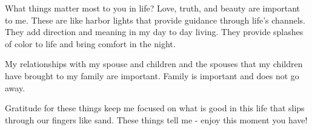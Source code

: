 What things matter most to you in life?
Love, truth, and beauty are important to me.
These are like harbor lights that provide guidance through life's channels.
They add direction and meaning in my day to day living.
They provide splashes of color to life and bring comfort in the night.

My relationships with my spouse and children and the spouses that my children have brought to my family are important.
Family is important and does not go away.

Gratitude for these things keep me focused on what is good in this life that slips through our fingers like sand.
These things tell me - enjoy this moment you have!





